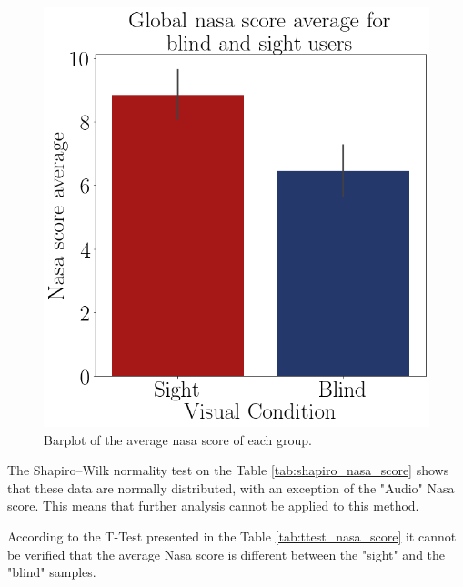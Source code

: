\begin{figure}[!htb]
\begin{minipage}{.45\linewidth}
        \includegraphics[width = \linewidth]{Resultados/Nasa/Figuras/png/barplot_nasa_avg_global.png}
        \caption{Barplot of the average nasa score of each group.}
        \label{fig:barplot_nasa_global}
    \end{minipage}
\end{figure}

The Shapiro–Wilk normality test on the Table \ref{tab:shapiro_nasa_score} shows that these data are normally distributed, with an exception of the "Audio" Nasa score. This means that further analysis cannot be applied to this method.

%

According to the T-Test presented in the Table \ref{tab:ttest_nasa_score} it cannot be verified that the average Nasa score is different between the "sight" and the "blind" samples.

%

\begin{table}[!htb]
    \begin{minipage}{.45\linewidth}
        
    \end{minipage}
    \hfill
    \begin{minipage}{.45\linewidth}
        \vspace{-2.75cm}
        
    \end{minipage}
\end{table}

